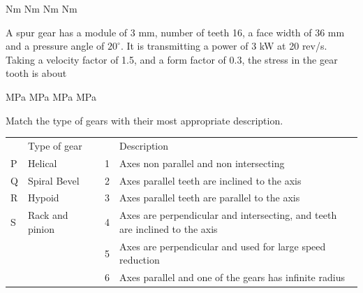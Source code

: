 \documentclass[addpoints,11pt]{exam}
\begin{document}
\begin{questions}
        \begin{oneparchoices}
             Nm
             Nm
             Nm
             Nm
        \end{oneparchoices}

        \question A spur gear has a module of 3 mm, number of teeth 16, a face width of 36 mm and a pressure angle of $20^\circ$. It is transmitting a power of 3 kW at 20 rev/s. Taking a velocity factor of 1.5, and a form factor of 0.3, the stress in the gear tooth is about

        \begin{oneparchoices}
             MPa
             MPa
             MPa
             MPa
        \end{oneparchoices}

        \question Match the type of gears with their most appropriate description.\\
        \begin{tabular}{|p{0.2in}|p{1in}|p{0.2in}|p{0.2in}|p{3in}|}
            \hline
              & Type of gear    &  &   & Description                                                                 \\
            \cline{1-2}\cline{4-5}
            P & Helical         &  & 1 & Axes non parallel and non intersecting                                      \\
            \cline{1-2}\cline{4-5}
            Q & Spiral Bevel    &  & 2 & Axes parallel teeth are inclined to the axis                                \\
            \cline{1-2}\cline{4-5}
            R & Hypoid          &  & 3 & Axes parallel teeth are parallel to the axis                                \\
            \cline{1-2}\cline{4-5}
            S & Rack and pinion &  & 4 & Axes are perpendicular and intersecting, and teeth are inclined to the axis \\
            \cline{1-2}\cline{4-5}
              &                 &  & 5 & Axes are perpendicular and used for large speed reduction                   \\
            \cline{1-2}\cline{4-5}
              &                 &  & 6 & Axes parallel and one of the gears has infinite radius                      \\
            \cline{1-2}\cline{4-5}
        \end{tabular}


\end{questions}
\end{document}
